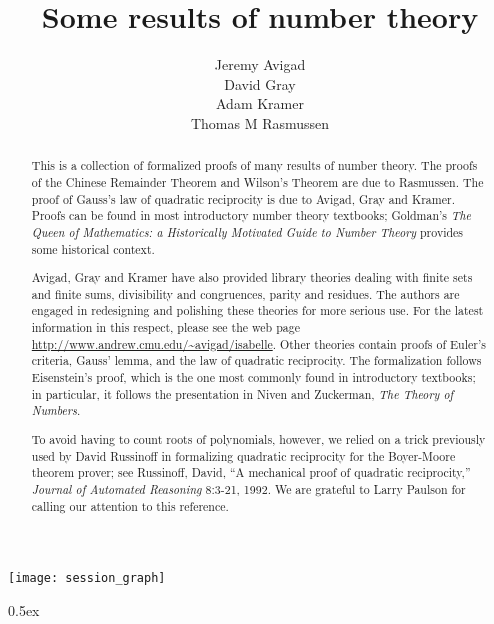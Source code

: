 \documentclass[11pt,a4paper]{article}
\begin{document}
\title{Some results of number theory}
\author{Jeremy Avigad\\
    David Gray\\
    Adam Kramer\\
    Thomas M Rasmussen}

\maketitle

\begin{abstract}
This is a collection of formalized proofs of many results of number theory.
The proofs of the Chinese Remainder Theorem and Wilson's Theorem are due to
Rasmussen.  The proof of Gauss's law of quadratic reciprocity is due to
Avigad, Gray and Kramer.  Proofs can be found in most introductory number
theory textbooks; Goldman's \emph{The Queen of Mathematics: a Historically
Motivated Guide to Number Theory} provides some historical context.

Avigad, Gray and Kramer have also provided library theories dealing with
finite sets and finite sums, divisibility and congruences, parity and
residues.  The authors are engaged in redesigning and polishing these theories
for more serious use.  For the latest information in this respect, please see
the web page \url{http://www.andrew.cmu.edu/~avigad/isabelle}.  Other theories
contain proofs of Euler's criteria, Gauss' lemma, and the law of quadratic
reciprocity.  The formalization follows Eisenstein's proof, which is the one
most commonly found in introductory textbooks; in particular, it follows the
presentation in Niven and Zuckerman, \emph{The Theory of Numbers}.

To avoid having to count roots of polynomials, however, we relied on a trick
previously used by David Russinoff in formalizing quadratic reciprocity for
the Boyer-Moore theorem prover; see Russinoff, David, ``A mechanical proof
of quadratic reciprocity,'' \emph{Journal of Automated Reasoning} 8:3-21,
1992.  We are grateful to Larry Paulson for calling our attention to this
reference.
\end{abstract}

\tableofcontents

\begin{center}
  \texttt{[image: session\_graph]}  
\end{center}

\newpage

\parindent 0pt\parskip 0.5ex




\end{document}
